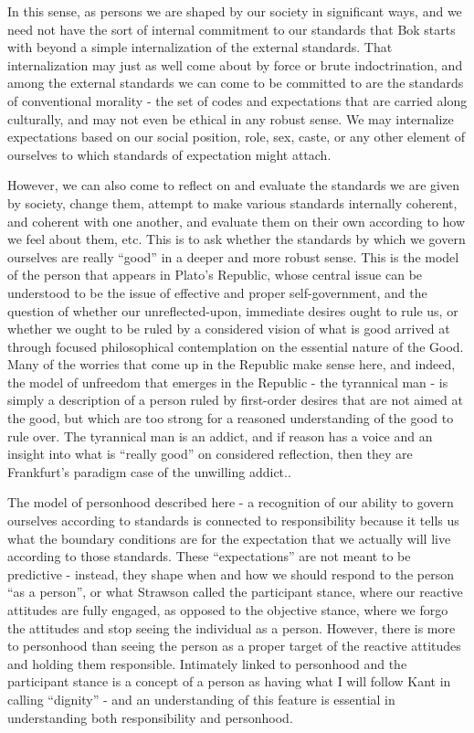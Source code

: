 \documentclass[phd,12pt,oneside,paper=letterpaper]{ubcthesis}
\begin{document}
In this sense, as persons we are shaped by our society in significant ways, and we need not have the sort of internal commitment to our standards that Bok starts with beyond a simple internalization of the external standards. That internalization may just as well come about by force or brute indoctrination, and among the external standards we can come to be committed to are the standards of conventional morality - the set of codes and expectations that are carried along culturally, and may not even be ethical in any robust sense. We may internalize expectations based on our social position, role, sex, caste, or any other element of ourselves to which standards of expectation might attach. 

However, we can also come to reflect on and evaluate the standards we are given by society, change them, attempt to make various standards internally coherent, and coherent with one another, and evaluate them on their own according to how we feel about them, etc. This is to ask whether the standards by which we govern ourselves are really ``good'' in a deeper and more robust sense. This is the model of the person that appears in Plato's Republic, whose central issue can be understood to be the issue of effective and proper self-government, and the question of whether our unreflected-upon, immediate desires ought to rule us, or whether we ought to be ruled by a considered vision of what is good arrived at through focused philosophical contemplation on the essential nature of the Good. Many of the worries that come up in the Republic make sense here, and indeed, the model of unfreedom that emerges in the Republic - the tyrannical man - is simply a description of a person ruled by first-order desires that are not aimed at the good, but which are too strong for a reasoned understanding of the good to rule over. The tyrannical man is an addict, and if reason has a voice and an insight into what is ``really good'' on considered reflection, then they are Frankfurt's paradigm case of the unwilling addict.. \citep[p.1180-99]{plato1997}

The model of personhood described here - a recognition of our ability to govern ourselves according to standards is connected to responsibility because it tells us what the boundary conditions are for the expectation that we actually will live according to those standards. These ``expectations'' are not meant to be predictive - instead, they shape when and how we should respond to the person ``as a person'', or what Strawson called the participant stance, where our reactive attitudes are fully engaged, as opposed to the objective stance, where we forgo the attitudes and stop seeing the individual as a person. However, there is more to personhood than seeing the person as a proper target of the reactive attitudes and holding them responsible. Intimately linked to personhood and the participant stance is a concept of a person as having what I will follow Kant in calling ``dignity'' - and an understanding of this feature is essential in understanding both responsibility and personhood. 
\end{document}
